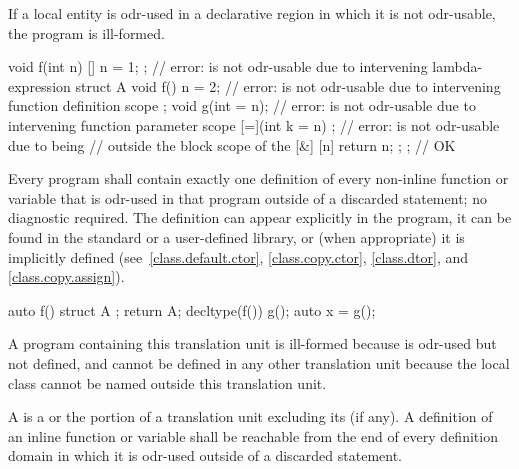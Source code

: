 If a local entity is odr-used
in a declarative region in which it is not odr-usable,
the program is ill-formed.
\begin{example}
\begin{codeblock}
void f(int n) {
  [] { n = 1; };                // error:  is not odr-usable due to intervening lambda-expression
  struct A {
    void f() { n = 2; }         // error:  is not odr-usable due to intervening function definition scope
  };
  void g(int = n);              // error:  is not odr-usable due to intervening function parameter scope
  [=](int k = n) {};            // error:  is not odr-usable due to being
                                // outside the block scope of the 
  [&] { [n]{ return n; }; };    // OK
}
\end{codeblock}
\end{example}

\pnum
Every program shall contain exactly one definition of every non-inline
function or variable that is odr-used in that program
outside of a discarded statement; no diagnostic required.
The definition can appear explicitly in the program, it can be found in
the standard or a user-defined library, or (when appropriate) it is
implicitly defined (see~\ref{class.default.ctor}, \ref{class.copy.ctor},
\ref{class.dtor}, and \ref{class.copy.assign}).
\begin{example}
\begin{codeblock}
auto f() {
  struct A {};
  return A{};
}
decltype(f()) g();
auto x = g();
\end{codeblock}
A program containing this translation unit is ill-formed
because  is odr-used but not defined,
and cannot be defined in any other translation unit
because the local class  cannot be named outside this
translation unit.
\end{example}

\pnum
A  is
a  or
the portion of a translation unit
excluding its  (if any).
A definition of an inline function or variable shall be reachable
from the end of every definition domain
in which it is odr-used outside of a discarded statement.

